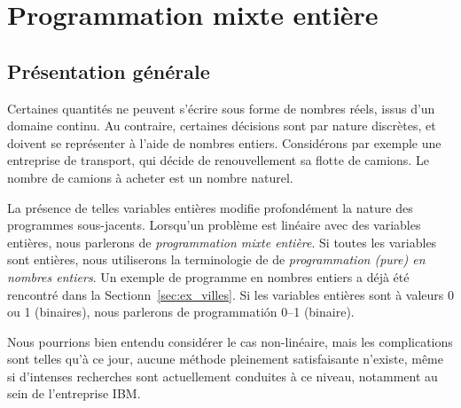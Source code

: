 \chapter{Programmation mixte entière}
\label{chap:integer}

\section{Présentation générale}

Certaines quantités ne peuvent s'écrire sous forme de nombres réels, issus d'un domaine continu. Au contraire, certaines décisions sont par nature discrètes, et doivent se représenter à l'aide de nombres entiers.
Considérons par exemple une entreprise de transport, qui décide de renouvellement sa flotte de camions.
Le nombre de camions à acheter est un nombre naturel.

La présence de telles variables entières modifie profondément la nature des programmes sous-jacents.
Lorsqu'un problème est linéaire avec des variables entières, nous parlerons de {\sl programmation mixte entière}.
Si toutes les variables sont entières, nous utiliserons la terminologie de de {\sl programmation (pure) en nombres entiers}.
Un exemple de programme en nombres entiers a déjà été rencontré dans la Sectionn~\ref{sec:ex_villes}.
Si les variables entières sont à valeurs 0 ou 1 (binaires), nous parlerons de programmatión 0--1 (binaire).

Nous pourrions bien entendu considérer le cas non-linéaire, mais les complications sont telles qu'à ce jour, aucune méthode pleinement satisfaisante n'existe, même si d'intenses recherches sont actuellement conduites à ce niveau, notamment au sein de l'entreprise IBM.

